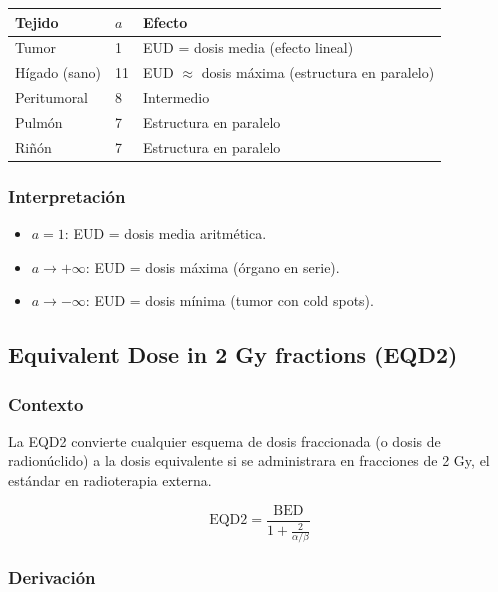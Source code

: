 \documentclass[12pt,a4paper]{article}
\begin{document}
\begin{tabular}{p{4cm} p{3cm} p{5cm}}
\toprule
\textbf{Tejido} & $a$ & \textbf{Efecto} \\
\midrule
Tumor & 1 & EUD = dosis media (efecto lineal) \\
Hígado (sano) & 11 & EUD $\approx$ dosis máxima (estructura en paralelo) \\
Peritumoral & 8 & Intermedio \\
Pulmón & 7 & Estructura en paralelo \\
Riñón & 7 & Estructura en paralelo \\
\bottomrule
\end{tabular}

\subsubsection{Interpretación}

\begin{itemize}
  \item $a = 1$: EUD = dosis media aritmética.
  \item $a \to +\infty$: EUD = dosis máxima (órgano en serie).
  \item $a \to -\infty$: EUD = dosis mínima (tumor con cold spots).
\end{itemize}

\subsection{Equivalent Dose in 2 Gy fractions (EQD2)}

\subsubsection{Contexto}

La EQD2 convierte cualquier esquema de dosis fraccionada (o dosis de radionúclido) a la dosis equivalente si se administrara en fracciones de 2 Gy, el estándar en radioterapia externa.

$$\text{EQD2} = \frac{\text{BED}}{1 + \frac{2}{\alpha/\beta}}$$


\subsubsection{Derivación}
\end{document}

